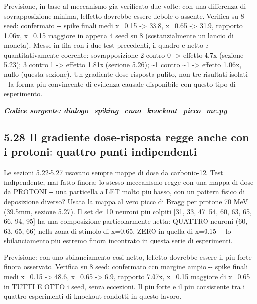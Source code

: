 \documentclass[
  italian,
]{article}
\begin{document}
Previsione, in base al meccanismo gia\textquotesingle{} verificato due volte: con una differenza di sovrapposizione minima, l\textquotesingle effetto dovrebbe essere debole o assente. Verifica su 8 seed: confermato -\/- spike finali medi x=0.15 -\textgreater{} 33.8, x=0.65 -\textgreater{} 31.9, rapporto 1.06x, x=0.15 maggiore in appena 4 seed su 8 (sostanzialmente un lancio di moneta). Messo in fila con i due test precedenti, il quadro e\textquotesingle{} netto e quantitativamente coerente: sovrapposizione 2 contro 0 -\textgreater{} effetto 4.7x (sezione 5.23); 3 contro 1 -\textgreater{} effetto 1.81x (sezione 5.26); \textasciitilde1 contro \textasciitilde1 -\textgreater{} effetto 1.06x, nullo (questa sezione). Un gradiente dose-risposta pulito, non tre risultati isolati -\/- la forma piu\textquotesingle{} convincente di evidenza causale disponibile con questo tipo di esperimento.

\textit{\textbf{Codice sorgente: dialogo\_\allowbreak{}spiking\_\allowbreak{}cnao\_\allowbreak{}knockout\_\allowbreak{}picco\_\allowbreak{}mc.py}}


\subsection{5.28 Il gradiente dose-risposta regge anche con i protoni: quattro punti indipendenti}\label{il-gradiente-dose-risposta-regge-anche-con-i-protoni-quattro-punti-indipendenti}

Le sezioni 5.22-5.27 usavano sempre mappe di dose da carbonio-12. Test indipendente, mai fatto finora: lo stesso meccanismo regge con una mappa di dose da PROTONI -\/- una particella a LET molto piu\textquotesingle{} basso, con un pattern fisico di deposizione diverso? Usata la mappa al vero picco di Bragg per protone 70 MeV (39.5mm, sezione 5.27). Il set dei 10 neuroni piu\textquotesingle{} colpiti {[}31, 33, 47, 54, 60, 63, 65, 66, 94, 95{]} ha una composizione particolarmente netta: QUATTRO neuroni (60, 63, 65, 66) nella zona di stimolo di x=0.65, ZERO in quella di x=0.15 -\/- lo sbilanciamento piu\textquotesingle{} estremo finora incontrato in questa serie di esperimenti.

Previsione: con uno sbilanciamento cosi\textquotesingle{} netto, l\textquotesingle effetto dovrebbe essere il piu\textquotesingle{} forte finora osservato. Verifica su 8 seed: confermato con margine ampio -\/- spike finali medi x=0.15 -\textgreater{} 48.6, x=0.65 -\textgreater{} 6.9, rapporto 7.07x, x=0.15 maggiore di x=0.65 in TUTTI E OTTO i seed, senza eccezioni. Il piu\textquotesingle{} forte e il piu\textquotesingle{} consistente tra i quattro esperimenti di knockout condotti in questo lavoro.
\end{document}
